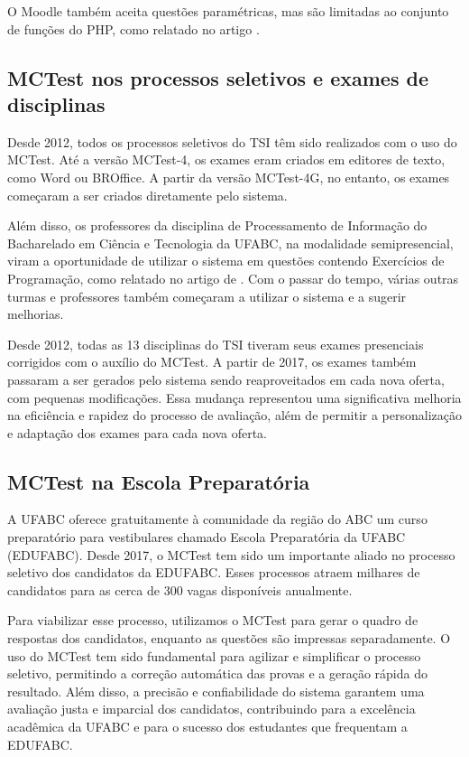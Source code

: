 O Moodle também aceita questões paramétricas, mas são limitadas ao conjunto de funções do PHP, como relatado no artigo \cite{2021:Zampirolli.Batista.ea*1}.

\subsection{MCTest nos processos seletivos e exames de disciplinas}

Desde 2012, todos os processos seletivos do TSI têm sido realizados com o uso do MCTest. Até a versão MCTest-4, os exames eram criados em editores de texto, como Word ou BROffice. A partir da versão MCTest-4G, no entanto, os exames começaram a ser criados diretamente pelo sistema.

Além disso, os professores da disciplina de Processamento de Informação do Bacharelado em Ciência e Tecnologia da UFABC, na modalidade semipresencial, viram a oportunidade de utilizar o sistema em questões contendo Exercícios de Programação, como relatado no artigo de . Com o passar do tempo, várias outras turmas e professores também começaram a utilizar o sistema e a sugerir melhorias.

Desde 2012, todas as 13 disciplinas do TSI tiveram seus exames presenciais corrigidos com o auxílio do MCTest. A partir de 2017, os exames também passaram a ser gerados pelo sistema sendo reaproveitados em cada nova oferta, com pequenas modificações. Essa mudança representou uma significativa melhoria na eficiência e rapidez do processo de avaliação, além de permitir a personalização e adaptação dos exames para cada nova oferta.

\subsection{MCTest na Escola Preparatória}

A UFABC oferece gratuitamente à comunidade da região do ABC um curso preparatório para vestibulares chamado Escola Preparatória da UFABC (EDUFABC). Desde 2017, o MCTest tem sido um importante aliado no processo seletivo dos candidatos da EDUFABC. Esses processos atraem milhares de candidatos para as cerca de 300 vagas disponíveis anualmente.

Para viabilizar esse processo, utilizamos o MCTest para gerar o quadro de respostas dos candidatos, enquanto as questões são impressas separadamente. O uso do MCTest tem sido fundamental para agilizar e simplificar o processo seletivo, permitindo a correção automática das provas e a geração rápida do resultado. Além disso, a precisão e confiabilidade do sistema garantem uma avaliação justa e imparcial dos candidatos, contribuindo para a excelência acadêmica da UFABC e para o sucesso dos estudantes que frequentam a EDUFABC.

